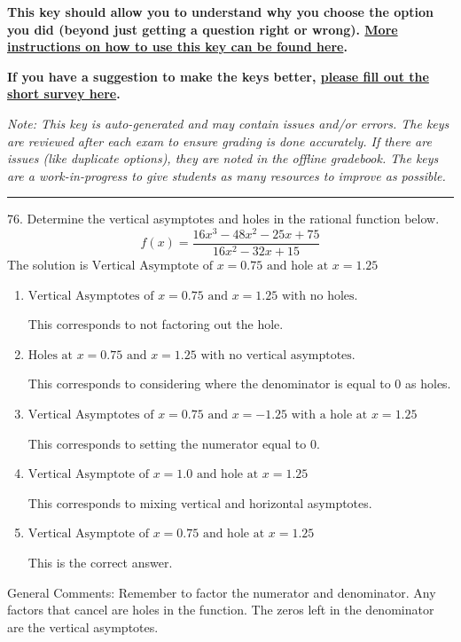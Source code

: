 \documentclass{extbook}[14pt]
\begin{document}
\textbf{This key should allow you to understand why you choose the option you did (beyond just getting a question right or wrong). \href{https://xronos.clas.ufl.edu/mac1105spring2020/courseDescriptionAndMisc/Exams/LearningFromResults}{More instructions on how to use this key can be found here}.}

\textbf{If you have a suggestion to make the keys better, \href{https://forms.gle/CZkbZmPbC9XALEE88}{please fill out the short survey here}.}

\textit{Note: This key is auto-generated and may contain issues and/or errors. The keys are reviewed after each exam to ensure grading is done accurately. If there are issues (like duplicate options), they are noted in the offline gradebook. The keys are a work-in-progress to give students as many resources to improve as possible.}

\rule{\textwidth}{0.4pt}

76. Determine the vertical asymptotes and holes in the rational function below.
\[ f(x) = \frac{16x^{3} -48 x^{2} -25 x + 75}{16x^{2} -32 x + 15} \] 
The solution is $ \text{Vertical Asymptote of } x = 0.75 \text{ and hole at } x = 1.25 $ 

\begin{enumerate}[label=\Alph*.] 
\item $ \text{Vertical Asymptotes of } x = 0.75 \text{ and } x = 1.25 \text{ with no holes.} $ 

 This corresponds to not factoring out the hole. 
\item $ \text{Holes at } x = 0.75 \text{ and } x = 1.25 \text{ with no vertical asymptotes.} $ 

 This corresponds to considering where the denominator is equal to 0 as holes. 
\item $ \text{Vertical Asymptotes of } x = 0.75 \text{ and } x = -1.25 \text{ with a hole at } x = 1.25 $ 

 This corresponds to setting the numerator equal to 0. 
\item $ \text{Vertical Asymptote of } x = 1.0 \text{ and hole at } x = 1.25 $ 

 This corresponds to mixing vertical and horizontal asymptotes. 
\item $ \text{Vertical Asymptote of } x = 0.75 \text{ and hole at } x = 1.25 $ 

 This is the correct answer. 
\end{enumerate} 
 
General Comments: Remember to factor the numerator and denominator. Any factors that cancel are holes in the function. The zeros left in the denominator are the vertical asymptotes.
\end{document}
